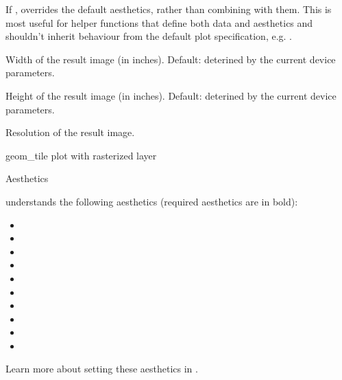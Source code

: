 \documentclass[a4paper]{book}
\begin{document}
\begin{Arguments}
\begin{ldescription}
\item[\code{inherit.aes}] If , overrides the default aesthetics,
rather than combining with them. This is most useful for helper functions
that define both data and aesthetics and shouldn't inherit behaviour from
the default plot specification, e.g. .

\item[\code{raster.width}] Width of the result image (in inches). Default: deterined by the current device parameters.

\item[\code{raster.height}] Height of the result image (in inches). Default: deterined by the current device parameters.

\item[\code{raster.dpi}] Resolution of the result image.
\end{ldescription}
\end{Arguments}
%
\begin{Value}
geom\_tile plot with rasterized layer
\end{Value}
%
\begin{Section}{Aesthetics}


 understands the following aesthetics (required aesthetics are in bold):
\begin{itemize}

\item{} 
\item{} 
\item{} 
\item{} 
\item{} 
\item{} 
\item{} 
\item{} 
\item{} 
\item{} 

\end{itemize}

Learn more about setting these aesthetics in .

\end{Section}
%
\begin{Examples}
\end{Examples}
\end{document}

